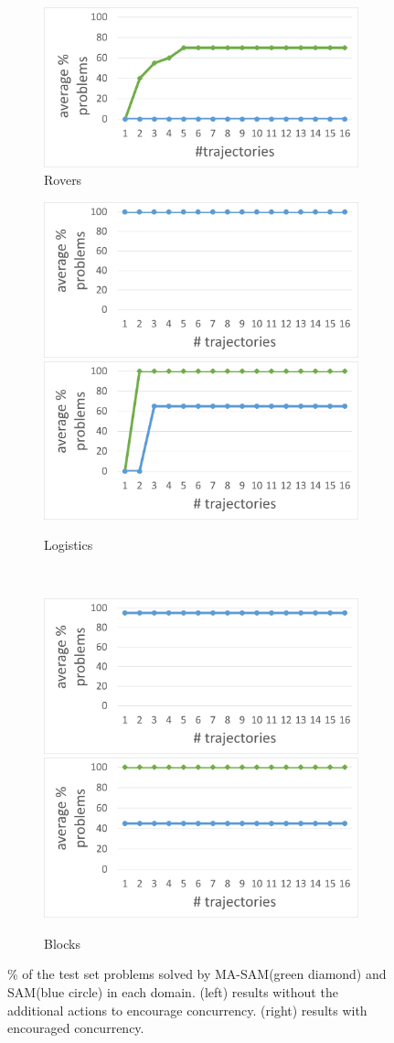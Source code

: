 \documentclass[letterpaper]{article} %
\theoremstyle{definition}
\theoremstyle{remark}
\newcommand{\sam}{\ac{SAM}\xspace}
\newcommand{\masam}{\ac{MA-SAM}\xspace}
\begin{document}
\begin{figure}[htbp]
\begin{subfigure}[b]{\columnwidth}
    \includegraphics[width=0.48\columnwidth]{figures/rover_hard_learning.png}
    \caption{Rovers}
    \label{fig:rovers-results}
  \end{subfigure}
  \begin{subfigure}[b]{\columnwidth}
    \centering
    \includegraphics[width=0.48\columnwidth]{figures/logistics_easy_learning.png}
    \includegraphics[width=0.48\columnwidth]{figures/logistics_hard_learning.png}
    \caption{Logistics}
    \label{fig:logistics-results}
  \end{subfigure}\\
  \begin{subfigure}[b]{\columnwidth}
    \centering
    \includegraphics[width=0.48\columnwidth]{figures/blocks_easy_learning.png}
    \includegraphics[width=0.48\columnwidth]{figures/blocks_hard_learning.png}
    \caption{Blocks}
    \label{fig:blocks-results}
  \end{subfigure}
  \caption{\% of the test set problems solved by \masam (green diamond) and \sam (blue circle) in each domain. (left) results without the additional actions to encourage concurrency. (right) results with encouraged concurrency.}
  \label{fig:solving-results}
\end{figure}
\end{document}
